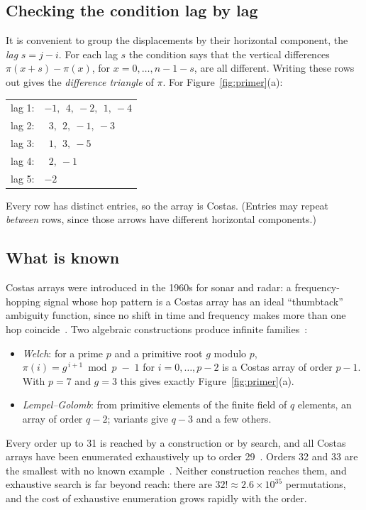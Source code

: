 \documentclass[11pt,a4paper]{article}
\theoremstyle{definition}
\begin{document}
\subsection{Checking the condition lag by lag}

It is convenient to group the displacements by their horizontal component, the \emph{lag}
$s=j-i$. For each lag $s$ the condition says that the vertical differences
$\pi(x+s)-\pi(x)$, for $x=0,\dots,n-1-s$, are all different. Writing these rows out gives
the \emph{difference triangle} of $\pi$. For Figure~\ref{fig:primer}(a):
\begin{center}
\begin{tabular}{@{}r l@{}}
lag 1: & $-1,\ \ 4,\ -2,\ \ 1,\ -4$\\
lag 2: & $\ \ 3,\ \ 2,\ -1,\ -3$\\
lag 3: & $\ \ 1,\ \ 3,\ -5$\\
lag 4: & $\ \ 2,\ -1$\\
lag 5: & $-2$
\end{tabular}
\end{center}
Every row has distinct entries, so the array is Costas. (Entries may repeat \emph{between}
rows, since those arrows have different horizontal components.)

\subsection{What is known}

Costas arrays were introduced in the 1960s for sonar and radar: a frequency-hopping signal
whose hop pattern is a Costas array has an ideal ``thumbtack'' ambiguity function, since no
shift in time and frequency makes more than one hop coincide~\cite{costas1984}. Two algebraic
constructions produce infinite families~\cite{golombtaylor1984}:
\begin{itemize}
\item \emph{Welch}: for a prime $p$ and a primitive root $g$ modulo $p$,
$\pi(i)=g^{\,i+1}\bmod p\;-\;1$ for $i=0,\dots,p-2$ is a Costas array of order $p-1$. With
$p=7$ and $g=3$ this gives exactly Figure~\ref{fig:primer}(a).
\item \emph{Lempel--Golomb}: from primitive elements of the finite field of $q$ elements, an
array of order $q-2$; variants give $q-3$ and a few others.
\end{itemize}
Every order up to 31 is reached by a construction or by search, and all Costas arrays have
been enumerated exhaustively up to order 29~\cite{drakakis2011}. Orders 32 and 33 are the
smallest with no known example~\cite{drakakis2006}. Neither construction reaches them, and
exhaustive search is far beyond reach: there are $32!\approx2.6\times10^{35}$ permutations,
and the cost of exhaustive enumeration grows rapidly with the order.
\end{document}
